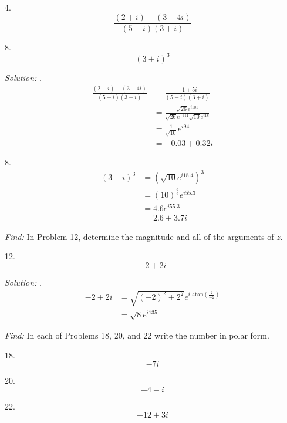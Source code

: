 \documentclass[11pt]{homework}
\begin{document}
4. 
\begin{equation*}
  \frac{(2+i)-(3-4i)}{(5-i)(3+i)}
\end{equation*}

8. 
\begin{equation*}
(3+i)^3
\end{equation*}

\emph{Solution:}
. 
\begin{align*}
\frac{(2+i)-(3-4i)}{(5-i)(3+i)}
  &= \frac{-1 + 5i}{(5-i)(3+i)}\\
  &= \frac{\sqrt{26}e^{i101}}{\sqrt{26}e^{-i11}\sqrt{10}e^{i18}}\\
  &= \frac{1}{\sqrt{10}} e^{i94} \\
  &= -0.03 + 0.32 i
\end{align*}

8.
\begin{align*}
(3+i)^3 
  &= (\sqrt{10} e^{i18.4})^3 \\
  &= (10)^{\frac{3}{2}} e^{i55.3} \\
  &= 4.6 e^{i55.3} \\
  &= 2.6 +3.7i
\end{align*}

\emph{Find:}
\newline
In Problem 12, determine the magnitude and all of the arguments 
of $z$.

12.
\begin{equation*}
  -2+2i
\end{equation*}

\emph{Solution:}
.
\begin{align*}
-2+2i
  &= \sqrt{(-2)^2 + 2^2} e^{i \text{ atan}(\frac{2}{-2})} \\
  &= \sqrt{8} e^{i135}
\end{align*}

\emph{Find:}
\newline
In each of Problems 18, 20, and 22
write the number in polar form.

18.
\begin{equation*}
-7i
\end{equation*}

20. 
\begin{equation*}
  -4 -i
\end{equation*}

22.
\begin{equation*}
  -12 +3i
\end{equation*}
\end{document}
